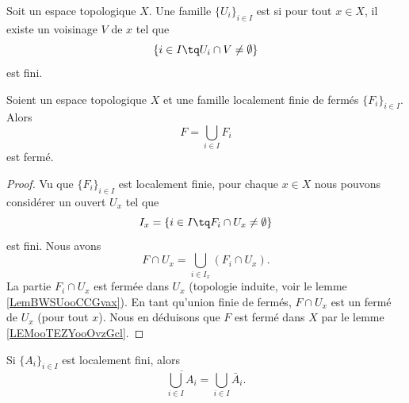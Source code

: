 \begin{definition}		\label{DEFooERRQooNOpCXD}
	Soit un espace topologique \( X\). Une famille \( \{ U_i \}_{i\in I}\) est  si pour tout \( x\in X\), il existe un voisinage \( V\) de \( x\) tel que
	\begin{equation}
		\{ i\in I\tq U_i\cap V\neq \emptyset \}
	\end{equation}
	est fini.
\end{definition}

\begin{proposition}	\label{PROPooKDMWooVyOkUE}
	Soient un espace topologique \( X\) et une famille localement finie de fermés \( \{ F_i \}_{i\in I}\). Alors
	\begin{equation}
		F=\bigcup_{i\in I}F_i
	\end{equation}
	est fermé.
\end{proposition}

\begin{proof}
	Vu que \( \{ F_i \}_{i\in I}\) est localement finie, pour chaque \( x\in X\) nous pouvons considérer un ouvert \( U_x\) tel que
	\begin{equation}
		I_x=\{ i\in I\tq F_i\cap U_x\neq \emptyset \}
	\end{equation}
	est fini. Nous avons
	\begin{equation}
		F\cap U_x=\bigcup_{i\in I_x}(F_i\cap U_x).
	\end{equation}
	La partie \( F_i\cap U_x\) est fermée dans \( U_x\) (topologie induite, voir le lemme \ref{LemBWSUooCCGvax}). En tant qu'union finie de fermés, \( F\cap U_x\) est un fermé de \( U_x\) (pour tout \( x\)). Nous en déduisons que \( F\) est fermé dans \( X\) par le lemme \ref{LEMooTEZYooOvzGcl}.
\end{proof}

\begin{proposition}	\label{PROPooRDVDooFYHgPV}
	Si \( \{ A_i \}_{i\in I}\) est localement fini, alors
	\begin{equation}
		\overline{\bigcup_{i\in I}A_i}=\bigcup_{i\in I}\bar A_i.
	\end{equation}
\end{proposition}

